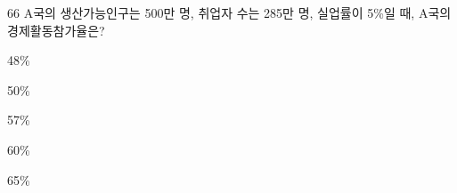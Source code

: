 \begin{question}{66}
A국의 생산가능인구는 500만 명, 취업자 수는 285만 명, 실업률이 5\%일 때, A국의 경제활동참가율은?
\begin{choices}
  \item 48\%
  \item 50\%
  \item 57\%
  \item 60\%
  \item 65\%
\end{choices}
\end{question}
